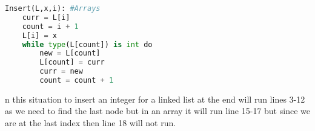 \documentclass{article}
\begin{document}
\begin{enumerate}[label=(\alph*)]
\begin{lstlisting}[language=Python]
Insert(L,x,i): #Arrays
    curr = L[i]
    count = i + 1
    L[i] = x
    while type(L[count]) is int do
        new = L[count]
        L[count] = curr
        curr = new
        count = count + 1 
\end{lstlisting}

\begin{SCfigure}
  \caption In this situation to insert an integer for a linked list at the end will run lines 3-12 as we need to find the last node but in an array it will run line 15-17 but since we are at the last index then line 18 will not run.
\end{SCfigure}


\end{enumerate}
\end{document}
